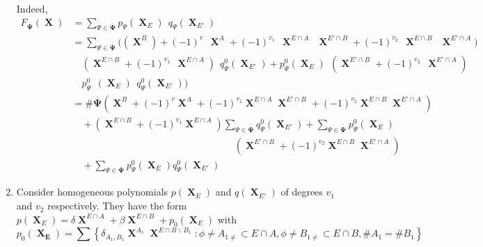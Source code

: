 \documentclass[a4paper,12pt]{article}
\DeclareMathOperator{\x}{\mathrm{X}}
\theoremstyle{definition}
\theoremstyle{underlinethm}
\theoremstyle{definition}
\begin{document}
\begin{enumerate}[label=(\alph*)]
Indeed,
\begin{align*}
F_{\overline{\boldsymbol{\Psi}}}(\boldsymbol{\x}) &= \sum_{\Psi \in \overline{\boldsymbol{\Psi}}} p_{\Psi} (\boldsymbol{\x}_{E})~~ q_{\Psi} (\boldsymbol{\x}_{E'})\\
&= \sum_{\Psi \in \overline{\boldsymbol{\Psi}}} \Bigg((\boldsymbol{\x}^{B}) + (-1)^{v}~~\boldsymbol{\x}^{A} + (-1)^{v_{1}}~~ \boldsymbol{\x}^{E \cap A} ~~\boldsymbol{\x}^{E'\cap B} + (-1)^{v_{2}}~~ \boldsymbol{\x}^{E \cap B}~~ \boldsymbol{\x}^{E' \cap A})\\ 
 &\quad  \left(\boldsymbol{\x}^{E \cap B} + (-1)^{v_{1}}~~ \boldsymbol{\x}^{E \cap A}\right)~~q_{\Psi}^{0} (\boldsymbol{\x}_{E'})  + p_{\Psi}^{0}(\boldsymbol{\x}_{E})~~ \left(\boldsymbol{\x}^{E' \cap B} + (-1)^{v_{2}}~~ \boldsymbol{\x}^{E' \cap A} \right)\\
 &\quad p_{\Psi}^{0}~~ (\boldsymbol{\x}_{E})~~ q_{\Psi}^{0}(\boldsymbol{\x}_{E'}) \Bigg)\\
 & = \# \overline{\boldsymbol{\Psi}} \left(\boldsymbol{\x}^{B} + (-1)^{v} \boldsymbol{\x}^{A} + (-1)^{v_{1}} \boldsymbol{\x}^{E \cap A} \boldsymbol{\x}^{E' \cap B} + (-1)^{v_{2}} \boldsymbol{\x}^{E \cap B} \boldsymbol{\x}^{E' \cap A} \right)\\
 &\quad + \left(\boldsymbol{\x}^{E \cap B} + (-1)^{v_{1}} \boldsymbol{\x}^{E \cap A}\right) \sum_{\Psi \in \overline{\boldsymbol{\Psi}}} q_{\Psi}^{0}(\boldsymbol{\x}_{E'}) + \sum_{\Psi \in \overline{\boldsymbol{\Psi}}} p_{\Psi}^{0}(\boldsymbol{\x}_{E}) \\
 &\hspace{7cm} \left(\boldsymbol{\x}^{E' \cap B} + (-1)^{v_{2}} \boldsymbol{\x}^{E \cap B} \boldsymbol{\x}^{E' \cap A} \right)\\
 & \quad + \sum_{\Psi \in \overline{\boldsymbol{\Psi}}} p_{\Psi}^{0} (\boldsymbol{\x}_{E}) q^{0}_{\Psi} (\boldsymbol{\x}_{E'})\tag{3.26}\label{eq-3.26}
\end{align*}

\item Consider homogeneous polynomials $p(\boldsymbol{\x}_{E})$ and $q(\boldsymbol{\x}_{E'})$ of degrees $v_{1}$ and $v_{2}$ respectively. They have the form
$p(\boldsymbol{\x}_{E}) = \delta \boldsymbol{\x}^{E \cap A} + \beta\boldsymbol{\x}^{E \cap B} + p_{0}(\boldsymbol{\x}_{E})$ with
\begin{equation}
p_{0}(\boldsymbol{\x_{E}}) = \sum\left\{\delta_{A_{1}, B_{1}} \boldsymbol{\x}^{A_{1}} \boldsymbol{\x}^{E \cap B \smallsetminus B_{1}} : \phi \neq A_{1 \neq} \subset E \cap A, \phi \neq B_{1 \neq} \subset E \cap B, \# A_{1}= \# B_{1}\right\}\tag{3.27}\label{eq-3.27} 
\end{equation}


\end{enumerate}
\end{document}
